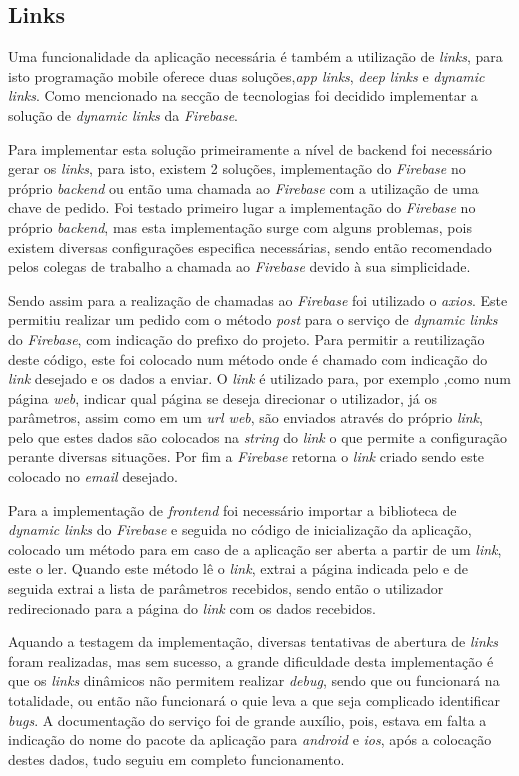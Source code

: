 \subsection{Links}
Uma funcionalidade da aplicação necessária é também a utilização de \textit{links}, para isto programação mobile oferece duas soluções,\textit{app links}, \textit{deep links} e \textit{dynamic links}. Como mencionado na secção de tecnologias foi decidido implementar a solução de \textit{dynamic links} da \textit{Firebase}.

Para implementar esta solução primeiramente a nível de backend foi necessário gerar os \textit{links}, para isto, existem 2 soluções, implementação do \textit{Firebase} no próprio \textit{backend} ou então uma chamada ao \textit{Firebase} com a utilização de uma chave de pedido. Foi testado primeiro lugar a implementação do \textit{Firebase} no próprio \textit{backend}, mas esta implementação surge com alguns problemas, pois existem diversas configurações especifica necessárias, sendo então recomendado pelos colegas de trabalho a chamada ao \textit{Firebase} devido à sua simplicidade.

Sendo assim para a realização de chamadas ao \textit{Firebase} foi utilizado o \textit{axios}. Este permitiu realizar um pedido com o método \textit{post} para o serviço de \textit{dynamic links} do \textit{Firebase}, com indicação do prefixo do projeto. Para permitir a reutilização deste código, este foi colocado num método onde é chamado com indicação do \textit{link} desejado e os dados a enviar. O \textit{link} é utilizado para, por exemplo ,como num página \textit{web}, indicar qual página se deseja direcionar o utilizador, já os parâmetros, assim como em um \textit{url web}, são enviados através do próprio \textit{link}, pelo que estes dados são colocados na \textit{string} do \textit{link} o que permite a configuração perante diversas situações. Por fim a \textit{Firebase} retorna o \textit{link} criado sendo este colocado no \textit{email} desejado.

Para a implementação de \textit{frontend} foi necessário importar a biblioteca de \textit{dynamic links} do \textit{Firebase} e seguida no código de inicialização da aplicação, colocado um método para em caso de a aplicação ser aberta a partir de um \textit{link}, este o ler. Quando este método lê o \textit{link}, extrai a página indicada pelo e de seguida extrai a lista de parâmetros recebidos, sendo então o utilizador redirecionado para a página do \textit{link} com os dados recebidos.

Aquando a testagem da implementação, diversas tentativas de abertura de \textit{links} foram realizadas, mas sem sucesso, a grande dificuldade desta implementação é que os \textit{links} dinâmicos não permitem realizar \textit{debug}, sendo que ou funcionará na totalidade, ou então não funcionará o quie leva a que seja complicado identificar \textit{bugs}. A documentação do serviço foi de grande auxílio, pois, estava em falta a indicação do nome do pacote da aplicação para \textit{android} e \textit{ios}, após a colocação destes dados, tudo seguiu em completo funcionamento.